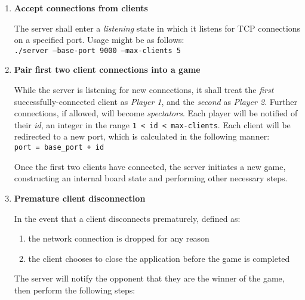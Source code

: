 \documentclass[letterpaper]{article}
\begin{document}
\begin{enumerate}
    \item \textbf{Accept connections from clients}
    
          The server shall enter a \emph{listening} state in
          which it listens for TCP connections on a specified
          port. Usage might be as follows:\\
          \newline
          \texttt{./server --base-port 9000 --max-clients 5}
          \newline
          
    \item \textbf{Pair first two client connections into a game}
    
          While the server is listening for new connections, it
          shall treat the \emph{first} successfully-connected
          client as \emph{Player 1}, and the \emph{second}
          as \emph{Player 2}. Further connections, if allowed,
          will become \emph{spectators}. Each player will be
          notified of their \emph{id}, an integer in the range
          \texttt{1 < id < max-clients}. Each client will be
          redirected to a new port, which is calculated in the
          following manner:\\
          \newline
          \texttt{port = base\_port + id}
          \newline
       
          Once the first two clients have connected, the server
          initiates a new game, constructing an internal board
          state and performing other necessary steps.
          
    \item \textbf{Premature client disconnection}
    
          In the event that a client disconnects prematurely,
          defined as:
          
          \begin{enumerate}
              \item the network connection is dropped for any
                    reason
              \item the client chooses to close the application
                    before the game is completed
          \end{enumerate}
          
          The server will notify the opponent that they are the
          winner of the game, then perform the following steps:
          

\end{enumerate}
\end{document}
